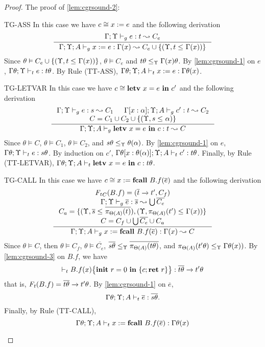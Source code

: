 {{{\begin{proof}
The proof of \ref{lem:cgrsound-2}:%
\begin{ProofEnumDesc}
\item[TG-ASS] In this case we have $c \cong \lcASS{x}{e}$ and the following derivation
\begin{equation*}
\inference
{\Gamma;\trace \vdash_{g} e : t \leadsto C_{e} }
{\Gamma;\trace; A \vdash_{g} \lcASS{x}{e} : \Gamma(x)\leadsto C_{e}\cup \{ (\trace, t \leq_{} \Gamma(x))\} }
\end{equation*}
Since $\theta\vDash C_{e}\cup \{ (\trace, t \leq_{} \Gamma(x))\}$,
$\theta\vDash C_{e}$ and $t\theta \leq_{\trace} \Gamma(x)\theta $.
By \ref{lem:cgrsound-1} on $e$, $\Gamma\theta;\trace \vdash_{t} e : t \theta$.
By Rule {(TT-ASS)}, $\Gamma\theta;\trace; A \vdash_{t} x := e : \Gamma\theta(x)$.

\item[TG-LETVAR] In this case we have $c \cong  \lcLETVAR{x}{e}{c'} $ and the following derivation
\begin{equation*}
\inference
{\Gamma;\trace \vdash_{g} e : s \leadsto C_1&
\Gamma[x:\alpha]; \trace; A \vdash_{g} c' : t \leadsto C_2 \\
C = C_1\cup C_2 \cup \{(\trace, s \leq_{} \alpha) \}
}
{\Gamma;\trace; A\vdash_{g} \lcLETVAR{x}{e}{c} :  t\leadsto C}
\end{equation*}
Since $\theta \vDash C$, $\theta \vDash C_1$, $\theta\vDash C_2$, and $s\theta \leq_{\trace} \theta(\alpha)$.
By \ref{lem:cgrsound-1} on $e$, $\Gamma\theta;\trace \vdash_{t} e : s \theta $.
By induction on $c'$,  $\Gamma\theta[x:\theta(\alpha)]; \trace; A \vdash_{t} c' : t\theta$.
Finally, by Rule {(TT-LETVAR)}, $\Gamma\theta; \trace; A \vdash_{t} \lcLETVAR{x}{e}{c}: t\theta $.

\item[TG-CALL] In this case we have $c \cong  \lcCALL{x}{B.f}{\overline{e}} $ and the following derivation
\begin{equation*}
\inference
{
\FT_{C}(B.f) = (\overline{t} \xrightarrow{} t', C_{f})  \\
\Gamma;\trace \vdash_{g} \overline{e} : \overline{s} \leadsto \bigcup \overline{C_{e}} \\
C_{a} = \{(\trace, \overline{s}\leq_{} \overline{\app{t}{\Theta(A)}}), (\trace, \app{t'}{\Theta(A)}\leq_{} \Gamma(x))\} \\
C = C_{f} \cup \bigcup\overline{C_{e}}\cup C_{a}
}
{
\Gamma;\trace; A \vdash_{g} \lcCALL{x}{B.f}{\overline{e}} : \Gamma(x)\leadsto C
}
\end{equation*}
Since $\theta \vDash C$, then $\theta \vDash C_{f}$, $\theta\vDash \overline{C_{e}}$,
$\overline{s\theta}\leq_{\trace} \overline{\app{t\theta}{\Theta(A)}}$,
and $\app{t'\theta}{\Theta(A)}\leq_{\trace} \Gamma\theta(x))$.
By \ref{lem:cgrsound-3} on $B.f$,  we have
$$
\vdash_{t} \lpPROG{B.f}{x}{c}{\lpRES} :  \overline{t\theta}\xrightarrow{} t'\theta
$$
that is, $\FT(B.f) =  \overline{t\theta}\xrightarrow{} t'\theta$.
By \ref{lem:cgrsound-1} on $\overline{e}$,
$$\Gamma\theta;\trace; A \vdash_{t} \overline{e} : \overline{s\theta}.$$
Finally, by Rule  {(TT-CALL)},
$$
\Gamma\theta;\trace; A \vdash_{t} \lcCALL{x}{B.f}{\overline{e}} : \Gamma\theta(x)
$$


\end{ProofEnumDesc}
\end{proof}}}}
